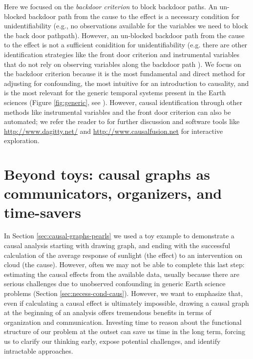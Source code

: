 \documentclass[12pt]{article}
\begin{document}
Here we focused on the \emph{backdoor criterion} to block backdoor
paths. An un-blocked backdoor path from the cause to the effect is a
necessary condition for unidentifiability (e.g., no observations
available for the variables we need to block the back door
pathpath). However, an un-blocked backdoor path from the cause to the
effect is not a sufficient conidition for unidentifiability
(e.g. there are other identification strategies like the front door
criterion and instrumental variables that do not rely on observing
variables along the backdoor path \citep{pearl2009causality}). We
focus on the backdoor criterion because it is the most fundamental and
direct method for adjusting for confounding, the most intuitive for an
introduction to causality, and is the most relevant for the generic
temporal systems present in the Earth sciences (Figure
\ref{fig:generic}, see \citet{tian2002general}).  However, causal
identification through other methods like instrumental variables and
the front door criterion can also be automated; we refer the reader to
\citet{pearl2009causality} for further discussion and software tools
like \url{http://www.dagitty.net/} and
\url{http://www.causalfusion.net} for interactive exploration.


\section{Beyond toys: causal graphs as communicators, organizers, and
  time-savers}\label{sec:causal-graphs-as}

In Section \ref{sec:causal-graphs-pearls} we used a toy example to
demonstrate a causal analysis starting with drawing graph, and ending
with the successful calculation of the average response of sunlight
(the effect) to an intervention on cloud (the cause). However, often
we may not be able to complete this last step: estimating the causal
effects from the available data, usually because there are serious
challenges due to unobserved confounding in generic Earth science
problems (Section \ref{sec:necess-cond-caus}). However, we want to
emphasize that, even if calculating a causal effect is ultimately
impossible, drawing a causal graph at the beginning of an analysis
offers tremendous benefits in terms of organization and
communication. Investing time to reason about the functional structure
of our problem at the outset can save us time in the long term,
forcing us to clarify our thinking early, expose potential challenges,
and identify intractable approaches.
\end{document}
